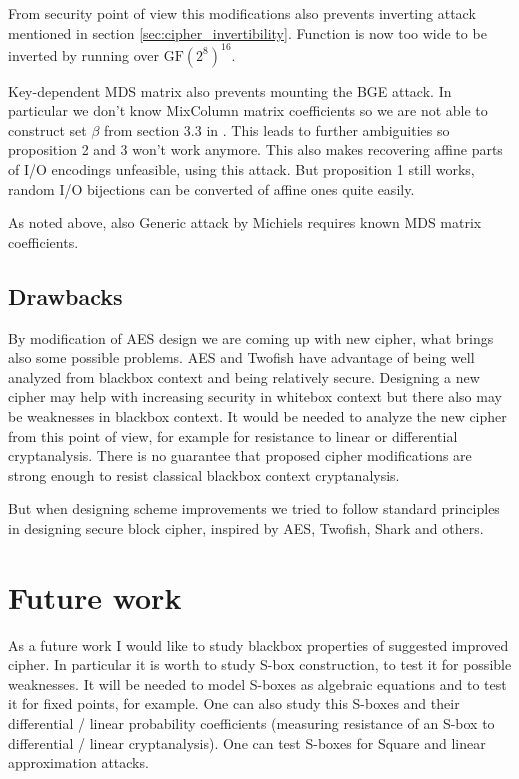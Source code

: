 \documentclass[11pt,oneside,final]{fithesis2}
\newcommand{\gfe}{\ensuremath{\text{GF}\left(2^8\right)}}
\begin{document}
    From security point of view this modifications also prevents inverting attack mentioned in section \ref{sec:cipher_invertibility}. Function is now too wide to be
    inverted by running over $\gfe^{16}$. 
    
    Key-dependent MDS matrix also prevents mounting the BGE attack. In particular we don't know MixColumn matrix coefficients so we are not able to construct set $\beta$
    from section 3.3 in \cite{Billet:2004:CWB:2080787.2080809}. This leads to further ambiguities so proposition 2 and 3 won't work anymore. This also makes recovering 
    affine parts of I/O encodings unfeasible, using this attack. But proposition 1 still works, random I/O bijections can be converted of affine ones quite easily.

    As noted above, also  Generic attack by Michiels \citep{Michiels:2007:MST:1314276.1314291} requires known MDS matrix coefficients.
    
    \section{Drawbacks}
    By modification of AES design we are coming up with new cipher, what brings also some possible problems. AES and Twofish have advantage of being well analyzed from blackbox 
    context and being relatively secure. Designing a new cipher may help with increasing security in whitebox context but there also may be weaknesses in blackbox context. 
    It would be needed to analyze the new cipher from this point of view, for example for resistance to linear or differential cryptanalysis. There is no guarantee that 
    proposed cipher modifications are strong enough to resist classical blackbox context cryptanalysis.
    
    But when designing scheme improvements we tried to follow standard principles in designing secure block cipher, inspired by AES, Twofish, Shark and others.
    
    
\chapter{Future work}\label{sec:futurework}
    As a future work I would like to study blackbox properties of suggested improved cipher. In particular it is worth to study S-box construction, to test
    it for possible weaknesses. It will be needed to model S-boxes as algebraic equations and to test it for fixed points, for example. One can also study this S-boxes
    and their differential / linear probability coefficients (measuring resistance of an S-box to differential / linear cryptanalysis). One can test S-boxes 
    for Square and linear approximation attacks. 
    
\end{document}
